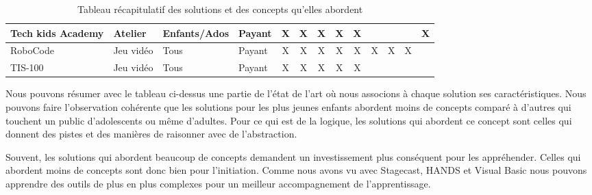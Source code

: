 \begin{table}[htb]
\begin{changemargin}{-3cm}{-3cm}
{\begin{tabular}{|l|l|l|l|c|c|c|c|c|c|c|c|c|}
Tech kids Academy & Atelier        & Enfants/Ados   & Payant  & X                             & X                               & X                              & X                           & X                             &                                  &                                   &                                      & X                            \\ \hline
RoboCode          & Jeu vidéo      & Tous           & Payant  & X                             & X                               & X                              & X                           & X                             & X                                & X                                 & X                                    &                              \\ \hline
TIS-100           & Jeu vidéo      & Tous           & Payant  & X                             & X                               & X                              & X                           & X                             &                                  &                                   &                                      &                              \\ \hline
\end{tabular}
}
\end{changemargin}
\caption{Tableau récapitulatif des solutions et des concepts qu'elles abordent}
\end{table}

Nous pouvons résumer avec le tableau ci-dessus une partie de l'état de l'art où nous associons à chaque solution ses caractéristiques. Nous pouvons faire l'observation cohérente que les solutions pour les plus jeunes enfants abordent moins de concepts comparé à d'autres qui touchent un public d'adolescents ou même d'adultes. Pour ce qui est de la logique, les solutions qui abordent ce concept sont celles qui donnent des pistes et des manières de raisonner avec de l'abstraction.

Souvent, les solutions qui abordent beaucoup de concepts demandent un investissement plus conséquent pour les appréhender. Celles qui abordent moins de concepts sont donc bien pour l'initiation. Comme nous avons vu avec  Stagecast, HANDS et Visual Basic nous pouvons apprendre des outils de plus en plus complexes pour un meilleur accompagnement de l'apprentissage.


\newpage


